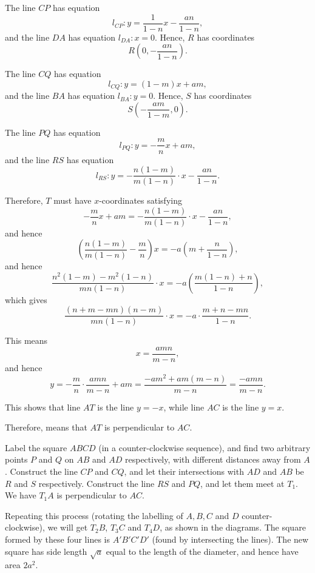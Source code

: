 \Question{\currfilebase}

\begin{center}
    
\end{center}

The line \(CP\) has equation
\[
    l_{CP}: y = \frac{1}{1 - n} x - \frac{an}{1 - n},
\]
and the line \(DA\) has equation \(l_{DA}: x = 0\). Hence, \(R\) has coordinates
\[
    R \left(0, -\frac{an}{1 - n}\right).
\]

The line \(CQ\) has equation
\[
    l_{CQ}: y = (1 - m)x + am,
\]
and the line \(BA\) has equation \(l_{BA}: y = 0\). Hence, \(S\) has coordinates
\[
    S \left(-\frac{am}{1 - m}, 0\right).
\]

The line \(PQ\) has equation
\[
    l_{PQ}: y = - \frac{m}{n} x + am,
\]
and the line \(RS\) has equation
\[
    l_{RS}: y = -\frac{n (1 - m)}{m (1 - n)} \cdot x - \frac{an}{1 - n}.
\]

Therefore, \(T\) must have \(x\)-coordinates satisfying
\[
    - \frac{m}{n} x + am = - \frac{n (1 - m)}{m (1 - n)} \cdot x - \frac{an}{1 - n},
\]
and hence
\[
    \left(\frac{n (1 - m)}{m (1 - n)} - \frac{m}{n}\right)x = - a \left(m + \frac{n}{1 - n}\right),
\]
and hence
\[
    \frac{n^2 (1 - m) - m^2 (1 - n)}{mn (1 - n)} \cdot x = -a \left(\frac{m (1 - n) + n}{1 - n}\right),
\]
which gives
\[
    \frac{(n + m - mn)(n - m)}{mn (1 - n)} \cdot x = -a \cdot \frac{m + n - mn}{1 - n}.
\]

This means
\[
    x = \frac{amn}{m - n},
\]
and hence
\[
    y = - \frac{m}{n} \cdot \frac{amn}{m - n} + am = \frac{-am^2 + am(m - n)}{m - n} = \frac{-amn}{m - n}.
\]

This shows that line \(AT\) is the line \(y = -x\), while line \(AC\) is the line \(y = x\).

Therefore, means that \(AT\) is perpendicular to \(AC\).

\begin{center}
    
\end{center}

Label the square \(ABCD\) (in a counter-clockwise sequence), and find two arbitrary points \(P\) and \(Q\) on \(AB\) and \(AD\) respectively, with different distances away from \(A\). Construct the line \(CP\) and \(CQ\), and let their intersections with \(AD\) and \(AB\) be \(R\) and \(S\) respectively. Construct the line \(RS\) and \(PQ\), and let them meet at \(T_1\). We have \(T_1 A\) is perpendicular to \(AC\).

Repeating this process (rotating the labelling of \(A, B, C\) and \(D\) counter-clockwise), we will get \(T_2 B\), \(T_3 C\) and \(T_4 D\), as shown in the diagrams. The square formed by these four lines is \(A' B' C' D'\) (found by intersecting the lines). The new square has side length \(\sqrt{a}\) equal to the length of the diameter, and hence have area \(2a^2\).